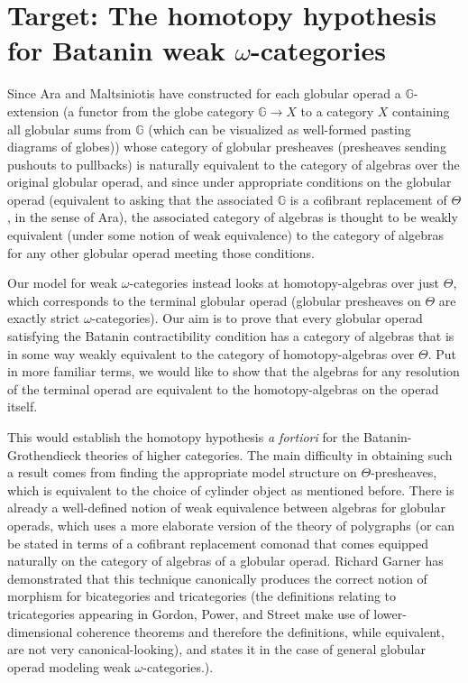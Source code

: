 \documentclass[a4paper,9pt]{amsart}
\theoremstyle{plain}   %
\theoremstyle{remark}
\theoremstyle{plain}
\begin{document}
\section{Target: The homotopy hypothesis for Batanin weak \(\omega\)-categories}
Since Ara and Maltsiniotis have constructed for each globular operad a \(\mathbb{G}\)-extension (a functor from the globe category \(\mathbb{G}\to X\) to a category \(X\) containing all globular sums from \(\mathbb{G}\) (which can be visualized as well-formed pasting diagrams of globes)) whose category of globular presheaves (presheaves sending pushouts to pullbacks) is naturally equivalent to the category of algebras over the original globular operad, and since under appropriate conditions on the globular operad (equivalent to asking that the associated \(\mathbb{G}\) is a cofibrant replacement of \(\Theta\), in the sense of Ara), the associated category of algebras is thought to be weakly equivalent (under some notion of weak equivalence) to the category of algebras for any other globular operad meeting those conditions.  

Our model for weak \(\omega\)-categories instead looks at homotopy-algebras over just \(\Theta\), which corresponds to the terminal globular operad (globular presheaves on \(\Theta\) are exactly strict \(\omega\)-categories). Our aim is to prove that every globular operad satisfying the Batanin contractibility condition has a category of algebras that is in some way weakly equivalent to the category of homotopy-algebras over \(\Theta\).  Put in more familiar terms, we would like to show that the algebras for any resolution of the terminal operad are equivalent to the homotopy-algebras on the operad itself.

This would establish the homotopy hypothesis \emph{a fortiori} for the Batanin-Grothendieck theories of higher categories.  The main difficulty in obtaining such a result comes from finding the appropriate model structure on \(\Theta\)-presheaves, which is equivalent to the choice of cylinder object as mentioned before.  There is already a well-defined notion of weak equivalence between algebras for globular operads, which uses a more elaborate version of the theory of polygraphs (or can be stated in terms of a cofibrant replacement comonad that comes equipped naturally on the category of algebras of a globular operad. Richard Garner has demonstrated that this technique canonically produces the correct notion of morphism for bicategories and tricategories (the definitions relating to tricategories appearing in Gordon, Power, and Street make use of lower-dimensional coherence theorems and therefore the definitions, while equivalent, are not very canonical-looking), and states it in the case of general globular operad modeling weak \(\omega\)-categories.). 
\end{document}
